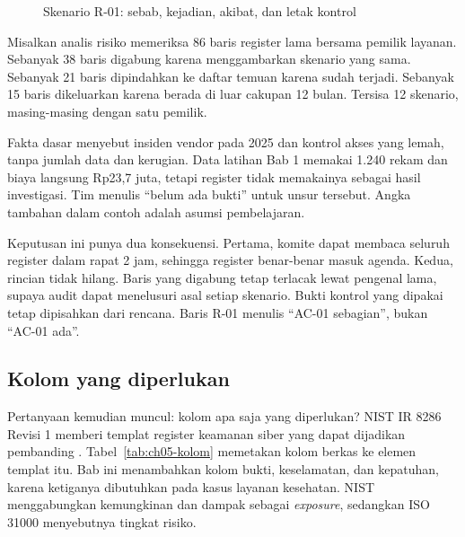 \begin{figure}[!htb]
  \centering
  
  \caption{Skenario R-01: sebab, kejadian, akibat, dan letak kontrol}
  \label{fig:ch05-skenario}
\end{figure}

\begin{kasus}[title={Kasus Medikara Health: Dari 86 Baris ke 12 Skenario}]
Misalkan analis risiko memeriksa 86 baris register lama bersama pemilik layanan. Sebanyak 38 baris
digabung karena menggambarkan skenario yang sama. Sebanyak 21 baris dipindahkan ke daftar temuan
karena sudah terjadi. Sebanyak 15 baris dikeluarkan karena berada di luar cakupan 12 bulan. Tersisa 12
skenario, masing-masing dengan satu pemilik.

Fakta dasar menyebut insiden vendor pada 2025 dan kontrol akses yang lemah, tanpa jumlah data dan
kerugian. Data latihan Bab 1 memakai 1.240 rekam dan biaya langsung Rp23,7 juta, tetapi register
tidak memakainya sebagai hasil investigasi. Tim menulis ``belum ada bukti'' untuk unsur tersebut.
Angka tambahan dalam contoh adalah asumsi pembelajaran.

Keputusan ini punya dua konsekuensi. Pertama, komite dapat membaca seluruh register dalam rapat 2 jam,
sehingga register benar-benar masuk agenda. Kedua, rincian tidak hilang. Baris yang digabung tetap
terlacak lewat pengenal lama, supaya audit dapat menelusuri asal setiap skenario. Bukti kontrol yang
dipakai tetap dipisahkan dari rencana. Baris R-01 menulis ``AC-01 sebagian'', bukan ``AC-01 ada''.
\end{kasus}

\subsection*{Kolom yang diperlukan}

Pertanyaan kemudian muncul: kolom apa saja yang diperlukan? NIST IR 8286 Revisi 1 memberi templat
register keamanan siber yang dapat dijadikan pembanding \cite{c05-nist-ir8286r1}.
Tabel~\ref{tab:ch05-kolom} memetakan kolom berkas  ke
elemen templat itu. Bab ini menambahkan kolom bukti, keselamatan, dan kepatuhan, karena ketiganya
dibutuhkan pada kasus layanan kesehatan. NIST menggabungkan kemungkinan dan dampak sebagai
\textit{exposure}, sedangkan ISO 31000 menyebutnya tingkat risiko.

